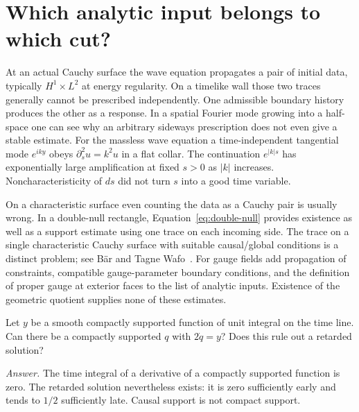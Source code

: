 \section{Which analytic input belongs to which cut?}
At an actual Cauchy surface the wave equation propagates a pair of initial data, typically $H^1\times L^2$ at energy regularity. On a timelike wall those two traces generally cannot be prescribed independently. One admissible boundary history produces the other as a response. In a spatial Fourier mode growing into a half-space one can see why an arbitrary sideways prescription does not even give a stable estimate. For the massless wave equation a time-independent tangential mode $e^{iky}$ obeys $\partial_s^2 u=k^2u$ in a flat collar. The continuation $e^{|k|s}$ has exponentially large amplification at fixed $s>0$ as $|k|$ increases. Noncharacteristicity of $ds$ did not turn $s$ into a good time variable.

On a characteristic surface even counting the data as a Cauchy pair is usually wrong. In a double-null rectangle, Equation~\eqref{eq:double-null} provides existence as well as a support estimate using one trace on each incoming side. The trace on a single characteristic Cauchy surface with suitable causal/global conditions is a distinct problem; see B\"ar and Tagne Wafo~\cite{BW}. For gauge fields add propagation of constraints, compatible gauge-parameter boundary conditions, and the definition of proper gauge at exterior faces to the list of analytic inputs. Existence of the geometric quotient supplies none of these estimates.

\begin{exercise}
Let $y$ be a smooth compactly supported function of unit integral on the time line. Can there be a compactly supported $q$ with $2\dot q=y$? Does this rule out a retarded solution?
\end{exercise}
\noindent\emph{Answer.} The time integral of a derivative of a compactly supported function is zero. The retarded solution nevertheless exists: it is zero sufficiently early and tends to $1/2$ sufficiently late. Causal support is not compact support.

